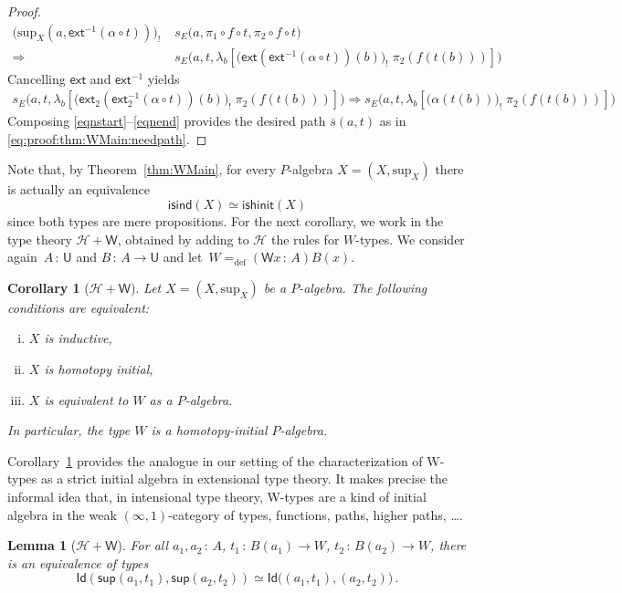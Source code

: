 \documentclass[10pt,a4paper,oneside,reqno]{amsart}
\theoremstyle{mythm}
\newtheorem{lemma}[theorem]{Lemma}
\newtheorem{corollary}[theorem]{Corollary}
\theoremstyle{mydef}
\theoremstyle{myrmk}
\newcommand{\defeq}{=_{\mathrm{def}}}
\newcommand{\co}{\,{:}\,}
\newcommand{\Hint}{\mathcal{H}}
\newcommand{\isalgind}{\mathsf{isind}}
\newcommand{\isalghinit}{\mathsf{ishinit}}
\newcommand{\ext}{\mathsf{ext}}
\newcommand{\Id}{\mathsf{Id}}
\newcommand{\lam}[1]{\lambda_{#1}}
\newcommand{\W}{\mathsf{W}}
\newcommand{\wsup}{\mathsf{sup}}
\newcommand{\U}{\mathsf{U}}
\renewcommand{\sup}{\mathrm{sup}}
\begin{document}
\begin{proof}
\begin{align*}
\big(\sup_X(a,\ext^{-1}(\alpha \circ t))\big)_{!} \; &s_E\big(a,\pi_1 \circ f \circ t, \pi_2 \circ f \circ t\big)\\
\Rightarrow\ & s_E\big(a,t, \lam{b}[ \big(\ext(\ext^{-1}(\alpha \circ t))(b)\big)_{!} \; \pi_2(f(t(b)))]\big)
\end{align*}
Cancelling $\ext$ and $\ext^{-1}$  yields
\begin{align}
s_E\big(a,t, \lam{b}[ \big(\ext_2(\ext^{-1}_2(\alpha \circ t))(b)\big)_{!} \; \pi_2(f(t(b)))]\big) \Rightarrow s_E\big(a,t, \lam{b}[ \big(\alpha(t(b))\big)_{!} \; \pi_2(f(t(b)))]\big)
 \label{eqnend}
\end{align}
Composing \eqref{eqnstart}--\eqref{eqnend} provides the desired path $\bar{s}(a,t)$ as in \eqref{eq:proof:thm:WMain:needpath}.
\end{proof}



Note that, by Theorem~\ref{thm:WMain}, for every $P$-algebra $X = (X, \sup_X)$ there is actually an equivalence 
\[
\isalgind(X) \simeq \isalghinit(X)
\]
since both types are mere propositions.  For the next corollary, we work in the type theory $\Hint + \W$, obtained by adding to $\Hint$ the rules for $W$-types.
We consider again~$A \co \U$ and $B \co A \to \U$ and let~$W \defeq (\W x \co A) B(x)$.

\begin{corollary}[$\Hint + \W$]
\label{lem:WInitInt} Let $X = (X, \sup_X)$ be a $P$-algebra. The following conditions are
equivalent:
\begin{enumerate}[(i)]
\item $X$ is inductive,
\item $X$ is homotopy initial,
\item $X$ is equivalent to $W$ as a $P$-algebra.
\end{enumerate}
In particular, the type $W$ is a homotopy-initial $P$-algebra.
\end{corollary}


Corollary~\ref{lem:WInitInt} provides the analogue in our setting of the characterization of W-types as a strict initial algebra in extensional type theory. It makes precise the informal idea that, in intensional type theory, W-types are a kind of initial algebra in the weak $(\infty, 1)$-category of types, functions, paths, higher paths, \ldots.  

\begin{lemma}[$\Hint + \W$]\label{lem:suppath}
For all $a_1,a_2 \co A$, $t_1 \co B(a_1) \to W$, $t_2 \co B(a_2) \to W$, there is an equivalence of types
\[ 
\Id ( \wsup(a_1,t_1),  \wsup(a_2,t_2)  ) \simeq  \Id \big( (a_1,t_1), (a_2,t_2) \big) \, . 
\]
\end{lemma}
\end{document}
